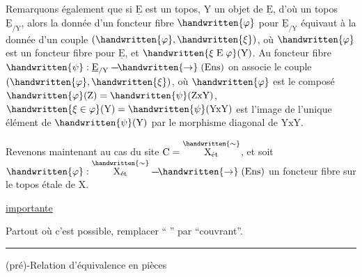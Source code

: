 \begin{lrbox}{\coteSixTypescript}
\begin{minipage}[t]{.96\linewidth}
 Remarquons également que si $\underline{\mathrm E}$ est un topos, $\mathrm Y$ un objet de $\underline{\mathrm E}$, d'où un topos $\underline{\mathrm E}_{/\mathrm Y}$, alors la donnée d'un foncteur fibre $\handwritten{\varphi}$ pour $\underline{\mathrm E}_{/\mathrm Y}$ équivaut à la donnée d'un couple $(\handwritten{\varphi},\handwritten{\xi})$, où $\handwritten{\varphi}$ est un foncteur fibre pour $\underline{\mathrm E}$, et $\handwritten{\xi\mathrel{\mathrm E}\varphi}(\mathrm Y)$. Au foncteur fibre $\handwritten{\psi}:\underline{\mathrm E}_{/\mathrm Y}\mathrel{\mbox{-}\mkern-2mu\mbox{-}\mkern-2mu\mbox{-}\mkern-3mu\handwritten{\to}}(\mathrm{Ens})$ on associe le couple $(\handwritten{\varphi},\handwritten{\xi})$, où $\handwritten{\varphi}$ est le composé $\handwritten{\varphi}(\mathrm Z)=\handwritten{\psi}(\mathrm Z\mathrm{x}\mathrm Y)$, $\handwritten{\xi\in\varphi}(\mathrm Y)=\handwritten{\psi}(\mathrm Y\mathrm{x}\mathrm Y)$ est l'image de l'unique élément de $\handwritten{\psi}(\mathrm Y)$ par le morphisme diagonal de $\mathrm Y\mathrm{x}\mathrm Y$.

 Revenons maintenant au cas du site $\mathrm C=\overset{\handwritten{\sim}}{\mathrm X_{\text{ét}}}$, et soit $\handwritten{\varphi}:\overset{\handwritten{\sim}}{\mathrm X_{\text{ét}}}\mathrel{\mbox{-}\mkern-2mu\mbox{-}\mkern-2mu\mbox{-}\mkern-3mu\handwritten{\to}}(\mathrm{Ens})$ un foncteur fibre sur le topos étale de $\mathrm X$.
\end{minipage}
\end{lrbox}
\noindent{}
\clearpage
{}

\uline{ importante}

Partout où c'est possible, remplacer ``   '' par ``couvrant''.

\noindent\rule{\linewidth}{.3pt}

(pré)-Relation d'équivalence en pièces  


